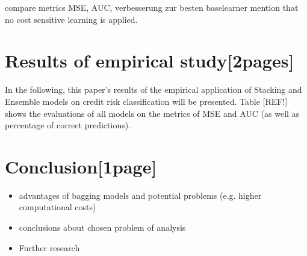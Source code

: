 \documentclass[12pt]{article}
\begin{document}
compare metrics MSE, AUC, verbesserung zur besten baselearner
mention that no cost sensitive learning is applied.

\section{Results of empirical study[2pages]}\label{results}
In the following, this paper's results of the empirical application of Stacking and Ensemble models on credit risk classification will be presented. Table [REF!] shows the evaluations of all models on the metrics of MSE and AUC (as well as percentage of correct predictions).


\section{Conclusion[1page]}
\begin{itemize}
\item advantages of bagging models and potential problems (e.g. higher computational costs)
\item conclusions about chosen problem of analysis
\item Further research	
\end{itemize}
\end{document}

